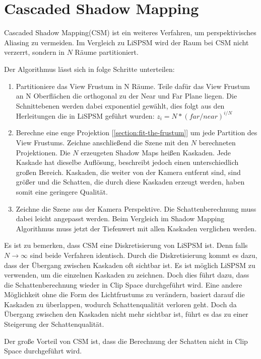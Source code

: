 \section{Cascaded Shadow Mapping}
\label{section:csm}
Cascaded Shadow Mapping(CSM) \cite{Engel2007}\cite{Zhang2006} ist ein weiteres Verfahren, um perspektivisches Aliasing zu vermeiden.
Im Vergleich zu LiSPSM wird der Raum bei CSM nicht verzerrt, sondern in $N$ Räume partitioniert.
\par
Der Algorithmus lässt sich in folge Schritte unterteilen:
\begin{enumerate}
  \item Partitioniere das View Frustum in N Räume. 
    Teile dafür das View Frustum an N Oberflächen die orthogonal zu der Near und Far Plane liegen.
    Die Schnittebenen werden dabei exponentiel gewählt, dies folgt aus den Herleitungen die in LiSPSM geführt wurden: 
    $z_{i} = N * (far / near)^{i/N}$
  \item Berechne eine enge Projektion [\ref{section:fit-the-frustum}] um jede Partition des View Frustums.
    Zeichne anschließend die Szene mit den $N$ berechneten Projektionen.
    Die $N$ erzeugeten Shadow Maps heißen Kaskaden.
    Jede Kaskade hat dieselbe Auflösung, beschreibt jedoch einen unterschiedlich großen Bereich.
    Kaskaden, die weiter von der Kamera entfernt sind, sind größer und die Schatten, die durch diese Kaskaden erzeugt werden, haben somit eine 
    geringere Qualität.

  \item Zeichne die Szene aus der Kamera Perspektive. 
    Die Schattenberechnung muss dabei leicht angepasst werden.
    Beim Vergleich im Shadow Mapping Algorithmus muss jetzt der Tiefenwert mit allen Kaskaden verglichen werden.
\end{enumerate}
Es ist zu bemerken, dass CSM eine Diskretisierung von LiSPSM ist. 
Denn falls $N\rightarrow\infty$ sind beide Verfahren identisch. 
Durch die Diskretisierung kommt es dazu, dass der Übergang zwischen Kaskaden oft sichtbar ist.
Es ist möglich LiSPSM zu verwenden, um die einzelnen Kaskaden zu zeichnen. 
Doch dies führt dazu, dass die Schattenberechnung wieder
in Clip Space durchgeführt wird. 
Eine andere Möglichkeit ohne die Form des Lichtfrustums zu verändern, basiert darauf die Kaskaden zu überlappen,
wodurch Schattenqualität verloren geht. 
Doch da Übergang zwischen den Kaskaden nicht mehr sichtbar ist,
führt es das zu einer Steigerung der Schattenqualität.
\par
Der große Vorteil von CSM ist, dass die Berechnung der Schatten nicht in Clip Space durchgeführt wird. 
